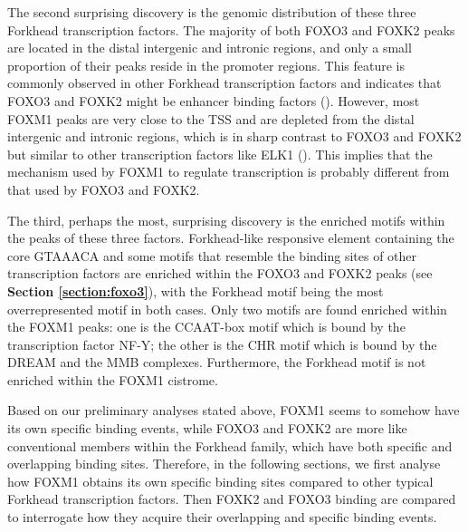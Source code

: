The second surprising discovery is the genomic distribution of these three Forkhead transcription factors. The majority of both FOXO3 and FOXK2 peaks are located in the distal intergenic and intronic regions, and only a small proportion of their peaks reside in the promoter regions. This feature is commonly observed in other Forkhead transcription factors and indicates that FOXO3 and FOXK2 might be enhancer binding factors (\cite{wang2011reprogramming}).  However, most FOXM1 peaks are very close to the TSS and are depleted from the distal intergenic and intronic regions, which is in sharp contrast to FOXO3 and FOXK2 but similar to other transcription factors like ELK1 (\cite{odrowaz2012elk1}). This implies that the mechanism used by FOXM1 to regulate transcription is probably different from that used by FOXO3 and FOXK2.

The third, perhaps the most, surprising discovery is the enriched motifs within the peaks of these three factors. Forkhead-like responsive element containing the core GTAAACA and some motifs that resemble the binding sites of other transcription factors are enriched within the FOXO3 and FOXK2 peaks (see \textbf{Section \ref{section:foxo3}}), with the Forkhead motif being the most overrepresented motif in both cases. Only two motifs are found enriched within the FOXM1 peaks: one is the CCAAT-box motif which is bound by the transcription factor NF-Y; the other is the CHR motif which is bound by the DREAM and the MMB complexes. Furthermore, the Forkhead motif is not enriched within the FOXM1 cistrome.

Based on our preliminary analyses stated above, FOXM1 seems to somehow have its own specific binding events, while FOXO3 and FOXK2 are more like conventional members within the Forkhead family, which have both specific and overlapping binding sites. Therefore, in the following sections, we first analyse how FOXM1 obtains its own specific binding sites compared to other typical Forkhead transcription factors. Then FOXK2 and FOXO3 binding are compared to interrogate how they acquire their overlapping and specific binding events.